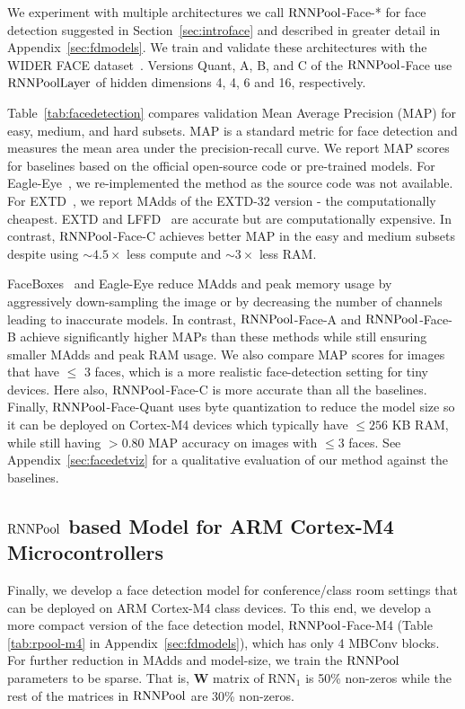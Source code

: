 \documentclass[10pt]{article}
\newcommand{\rpool}{\ensuremath{{\rm RNNPool}}\xspace}
\newcommand{\rpoollayer}{\ensuremath{{\rm RNNPoolLayer}}\xspace}
\begin{document}
We experiment with multiple architectures we call \rpool-Face-* for
face detection suggested in Section~\ref{sec:introface} and described
in greater detail in Appendix~\ref{sec:fdmodels}.  We train and
validate these architectures with the WIDER FACE
dataset~\citep{yang2016wider}. Versions Quant, A, B, and C of the \rpool-Face
use \rpoollayer of hidden dimensions 4, 4, 6 and 16,  
respectively.

Table~\ref{tab:facedetection} compares validation Mean Average
Precision (MAP) for easy, medium, and hard subsets. MAP is a standard
metric for face detection and measures the mean area under the
precision-recall curve.
We report MAP scores for baselines
based on the official open-source code or pre-trained models. For
Eagle-Eye~\citep{zhao2019real}, we re-implemented the method as the
source code was not available. For EXTD~\citep{yoo2019extd}, we report
MAdds of the EXTD-32 version - the computationally cheapest. EXTD and
LFFD~\citep{he2019lffd} are accurate but are computationally
expensive. In contrast, \rpool-Face-C achieves better MAP in the easy
and medium subsets despite using $\sim4.5\times$ less compute and
$\sim3\times$ less RAM.

FaceBoxes~\citep{zhang2017faceboxes} and Eagle-Eye reduce MAdds and
peak memory usage by aggressively down-sampling the image or by decreasing
the number of channels leading to inaccurate models. In
contrast, \rpool-Face-A and \rpool-Face-B achieve significantly higher
MAPs than these methods while still ensuring smaller MAdds and peak
RAM usage. We also compare MAP scores for images that have $\leq$ 3
faces, which is a more realistic face-detection setting for
tiny devices. Here also, \rpool-Face-C is more
accurate than all the baselines. Finally, \rpool-Face-Quant uses byte quantization to
reduce the model size so it can be deployed on Cortex-M4 devices which
typically have $\leq 256$ KB RAM, while still having $>0.80$ MAP
accuracy on images with $\leq 3$ faces. See
Appendix~\ref{sec:facedetviz} for a qualitative evaluation of our
method against the baselines.

\subsection{\rpool based Model for ARM Cortex-M4 Microcontrollers}
Finally, we develop a face detection model for conference/class room settings that can be deployed on ARM Cortex-M4 class devices. To this end,  we develop a
more compact version of the face detection model, \rpool-Face-M4
(Table \ref{tab:rpool-m4} in Appendix~\ref{sec:fdmodels}), which has
only 4 MBConv blocks. For further reduction in MAdds and model-size, we train the \rpool parameters to be sparse. That is, 
$\mathbf{W}$ matrix of $\mathrm{RNN}_1$ is 50\% non-zeros while the rest
of the matrices in \rpool are 30\% non-zeros.
\end{document}
